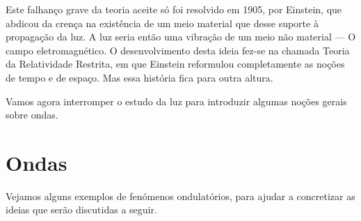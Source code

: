 Este falhanço grave da teoria aceite só foi resolvido em 1905, por Einstein,
que abdicou da crença na existência de um meio material que desse suporte à
propagação da luz. A luz seria então uma vibração de um meio não material --- O
campo eletromagnético. O desenvolvimento desta ideia fez-se na chamada Teoria da
Relatividade Restrita, em que Einstein reformulou completamente as noções de
tempo e de espaço. Mas essa história fica para outra altura.

Vamos agora interromper o estudo da luz para introduzir algumas noções gerais
sobre ondas.

\section{Ondas}
Vejamos alguns exemplos de fenómenos ondulatórios, para ajudar a concretizar as
ideias que serão discutidas a seguir.
